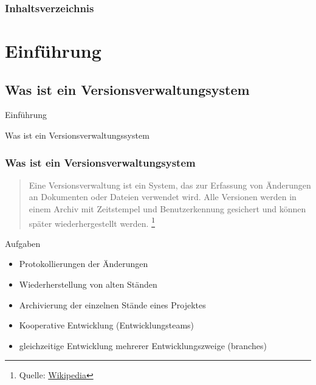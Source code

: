 \documentclass{beamer}
\begin{document}
\begin{frame}
\titlepage
\end{frame}

\begin{frame}
\frametitle{Inhaltsverzeichnis}\tableofcontents
\end{frame}

\section{Einführung} 


\subsection{Was ist ein Versionsverwaltungsystem}
\begin{frame}[c]{Einführung}
\begin{center}
\begin{Huge}
Was ist ein Versionsverwaltungssystem
\end{Huge}
\end{center}
\end{frame}

\begin{frame}\frametitle{Was ist ein Versionsverwaltungsystem} 
\begin{quote}
Eine Versionsverwaltung ist ein System, das zur Erfassung von Änderungen an Dokumenten oder Dateien verwendet wird. Alle Versionen werden in einem Archiv mit Zeitstempel und Benutzerkennung gesichert und können später wiederhergestellt werden.
\footnote{Quelle: \href{http://de.wikipedia.org/wiki/Versionsverwaltung}{Wikipedia}}
\end{quote} 

Aufgaben
\begin{itemize}
\item  Protokollierungen der Änderungen
\item  Wiederherstellung von alten Ständen 
\item  Archivierung der einzelnen Stände eines Projektes
\item  Kooperative Entwicklung (Entwicklungsteams)
\item  gleichzeitige Entwicklung mehrerer Entwicklungszweige (branches)
\end{itemize} 
\end{frame}

\end{document}
